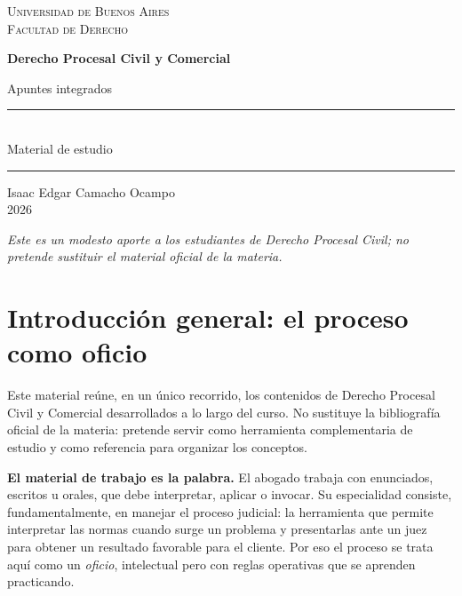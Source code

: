 \documentclass[12pt,oneside]{book}
\newcommand{\universidad}{Universidad de Buenos Aires}
\newcommand{\facultad}{Facultad de Derecho}
\newcommand{\materia}{Derecho Procesal Civil y Comercial}
\newcommand{\autor}{Isaac Edgar Camacho Ocampo}
\newcommand{\anio}{2026}
\begin{document}
\frontmatter
\begin{titlepage}
\thispagestyle{empty}
\begin{center}
\vspace*{1cm}
{\large\textsc{\universidad}}\\[0.3cm]
{\large\textsc{\facultad}}
\vspace{3cm}

{\Huge\bfseries\color{azul}\materia}
\vspace{0.8cm}

{\LARGE Apuntes integrados}
\vspace{1.2cm}

\rule{0.70\textwidth}{0.5pt}\\[0.5cm]
{\large Material de estudio}\\[0.5cm]
\rule{0.70\textwidth}{0.5pt}
\vfill
{\large\autor}\\[0.3cm]
{\large\anio}
\end{center}
\vfill
\begin{flushleft}
\small\textit{Este es un modesto aporte a los estudiantes de Derecho Procesal Civil; no pretende sustituir el material oficial de la materia.}
\end{flushleft}
\end{titlepage}

\tableofcontents
\mainmatter

\chapter*{Introducción general: el proceso como oficio}

Este material reúne, en un único recorrido, los contenidos de Derecho Procesal Civil y Comercial desarrollados a lo largo del curso. No sustituye la bibliografía oficial de la materia: pretende servir como herramienta complementaria de estudio y como referencia para organizar los conceptos.

\textbf{El material de trabajo es la palabra.} El abogado trabaja con enunciados, escritos u orales, que debe interpretar, aplicar o invocar. Su especialidad consiste, fundamentalmente, en manejar el proceso judicial: la herramienta que permite interpretar las normas cuando surge un problema y presentarlas ante un juez para obtener un resultado favorable para el cliente. Por eso el proceso se trata aquí como un \emph{oficio}, intelectual pero con reglas operativas que se aprenden practicando.
\end{document}

